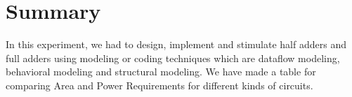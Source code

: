 








\section{Summary}
In this experiment, we had to design, implement and stimulate half adders and full adders using modeling or coding techniques which are dataflow modeling, behavioral modeling and structural modeling.
We have made a table for comparing Area and Power Requirements for different kinds of circuits.\\

